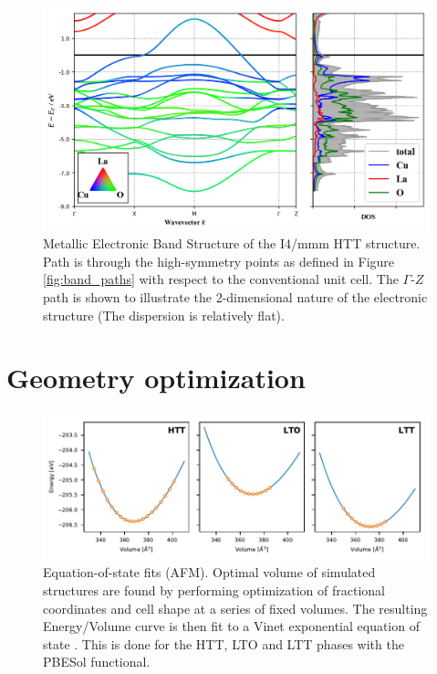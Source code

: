 
\begin{figure}
    \centering
    \includegraphics[width=\textwidth]{fig/simulation/bs_metal.png}
    \caption[GGA: Metallic Electronic Band Structure]{Metallic Electronic Band Structure of the I4/mmm HTT structure. Path is through the high-symmetry points as defined in Figure \ref{fig:band_paths} with respect to the conventional unit cell. The $\Gamma$-$Z$ path is shown to illustrate the 2-dimensional nature of the electronic structure (The dispersion is relatively flat).}
    \label{fig:bs_metal}
\end{figure}

\section{Geometry optimization}

\begin{figure}
    \centering
    \includegraphics[width=\textwidth]{fig/simulation/eos_all.pdf}
    \caption[AFM: Equation-of-state fits]{Equation-of-state fits (AFM). Optimal volume of simulated structures are found by performing optimization of fractional coordinates and cell shape at a series of fixed volumes. The resulting Energy/Volume curve is then fit to a Vinet exponential equation of state \cite{Vinet1987}. This is done for the HTT, LTO and LTT phases with the PBESol functional.}
    \label{fig:eos_all}
\end{figure}

